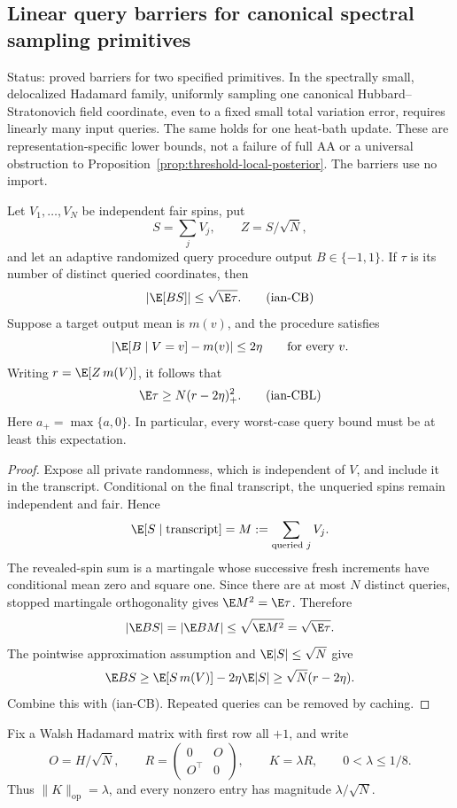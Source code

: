 \subsection{Linear query barriers for canonical spectral sampling primitives}
\label{ian:spectral-posterior-barriers}

Status: proved barriers for two specified primitives. In the spectrally
small, delocalized Hadamard family, uniformly sampling one canonical
Hubbard--Stratonovich field coordinate, even to a fixed small total
variation error, requires linearly many input queries. The same holds
for one heat-bath update. These are representation-specific lower
bounds, not a failure of full AA or a universal obstruction to
Proposition~\ref{prop:threshold-local-posterior}. The barriers use no
import.

\begin{lemma}
\label{ian:adaptive-correlation-budget}
Let \(V_1,\ldots,V_N\) be independent fair spins, put
\[
 S=\sum_jV_j,\qquad Z=S/\sqrt N,
\]
and let an adaptive randomized query procedure output \(B\in\{-1,1\}\).
If \(\tau\) is its number of distinct queried coordinates, then
\[
 |\E[BS]|\le\sqrt{\E\tau}.
 \tag{ian-CB}
\]
Suppose a target output mean is \(m(v)\), and the procedure satisfies
\[
 \left|\E[B\mid V=v]-m(v)\right|\le2\eta
 \qquad\text{for every }v.
\]
Writing \(r=\E[Z\,m(V)]\), it follows that
\[
 \E\tau\ge N(r-2\eta)_+^2.
 \tag{ian-CBL}
\]
Here \(a_+=\max\{a,0\}\). In particular, every worst-case query bound
must be at least this expectation.
\end{lemma}

\begin{proof}
Expose all private randomness, which is independent of \(V\), and
include it in the transcript. Conditional on the final transcript,
the unqueried spins remain independent and fair. Hence
\[
 \E[S\mid\text{transcript}]
 =M:=\sum_{\text{queried }j}V_j.
\]
The revealed-spin sum is a martingale whose successive fresh increments
have conditional mean zero and square one. Since there are at most
\(N\) distinct queries, stopped martingale orthogonality gives
\(\E M^2=\E\tau\). Therefore
\[
 |\E BS|=|\E BM|\le\sqrt{\E M^2}=\sqrt{\E\tau}.
\]
The pointwise approximation assumption and \(\E|S|\le\sqrt N\) give
\[
 \E BS\ge \E[S\,m(V)]-2\eta\E|S|
 \ge\sqrt N(r-2\eta).
\]
Combine this with (ian-CB). Repeated queries can be removed by caching.
\end{proof}

Fix a Walsh Hadamard matrix with first row all \(+1\), and write
\[
 O=H/\sqrt N,\qquad
 R=\begin{pmatrix}0&O\\O^\top&0\end{pmatrix},\qquad
 K=\lambda R,\qquad 0<\lambda\le1/8.
 \tag{ian-HS-family}
\]
Thus \(\|K\|_{\mathrm{op}}=\lambda\), and every nonzero entry has
magnitude \(\lambda/\sqrt N\).

